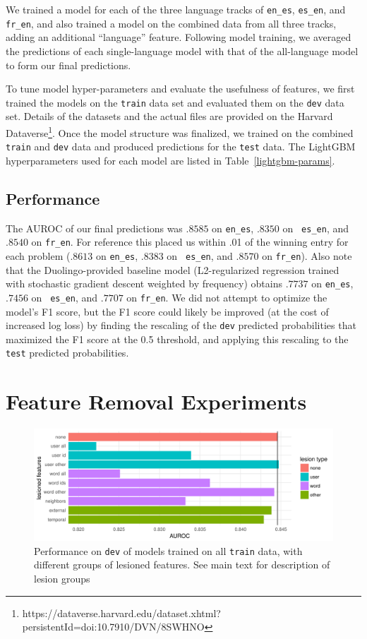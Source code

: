 \documentclass[11pt,a4paper]{article}
\begin{document}
We trained a model for each of the three language tracks of {\tt en\_es}, {\tt es\_en},
and {\tt fr\_en}, and also trained a model on the combined data from
all three tracks, adding an additional ``language'' feature. Following model
training, we averaged the predictions of each single-language model with that of
the all-language model to form our final predictions.

To tune model hyper-parameters and evaluate the usefulness of features, we first
trained the models on the {\tt train} data set and evaluated them on the {\tt dev}
data set. Details of the datasets and the actual files are provided on the
Harvard Dataverse\footnote{https://dataverse.harvard.edu/dataset.xhtml?persistentId=doi:10.7910/DVN/8SWHNO}.
Once the model structure was finalized, we trained on the combined
{\tt train} and {\tt dev} data and produced predictions for the {\tt test} data. The
LightGBM hyperparameters used for each model are listed in Table~\ref{lightgbm-params}.



\subsection{Performance}

The AUROC of our final predictions was $.8585$ on {\tt en\_es}, $.8350$ on {\tt
  es\_en}, and $.8540$ on {\tt fr\_en}. For reference this placed us within .01 of the winning
  entry for each problem ($.8613$ on {\tt en\_es}, $.8383$ on {\tt
  es\_en}, and $.8570$ on {\tt fr\_en}).  Also note that the Duolingo-provided baseline
  model (L2-regularized regression trained with stochastic gradient descent weighted
  by frequency) obtains $.7737$ on {\tt en\_es}, $.7456$ on {\tt
  es\_en}, and $.7707$ on {\tt fr\_en}.
  We did not attempt to optimize the model's
F1 score, but the F1 score could likely be improved (at the cost of
increased log loss) by finding the
rescaling of the {\tt dev} predicted probabilities that maximized the F1 score at
the 0.5 threshold, and applying this rescaling to the {\tt test} predicted probabilities.

\section{Feature Removal Experiments}

\begin{figure}[htp]
\includegraphics[width=\textwidth]{lesions.pdf}
\caption{Performance on {\tt dev} of models trained on all {\tt train} data,
  with different groups of lesioned features. See main text for description of
  lesion groups}
\label{fig:lesions}
\end{figure}
\end{document}
